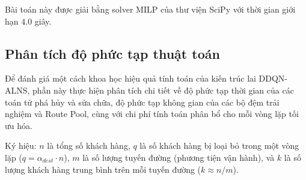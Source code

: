\documentclass[13pt,a4paper]{extarticle}
\begin{document}
Bài toán này được giải bằng solver MILP của thư viện SciPy với thời gian giới hạn $4.0$ giây.

\subsection{Phân tích độ phức tạp thuật toán}

Để đánh giá một cách khoa học hiệu quả tính toán của kiến trúc lai DDQN-ALNS, phần này thực hiện phân tích chi tiết về độ phức tạp thời gian của các toán tử phá hủy và sửa chữa, độ phức tạp không gian của các bộ đệm trải nghiệm và Route Pool, cùng với chi phí tính toán phân bổ cho mỗi vòng lặp tối ưu hóa.

Ký hiệu: $n$ là tổng số khách hàng, $q$ là số khách hàng bị loại bỏ trong một vòng lặp ($q = \alpha_{dest} \cdot n$), $m$ là số lượng tuyến đường (phương tiện vận hành), và $k$ là số lượng khách hàng trung bình trên mỗi tuyến đường ($k \approx n/m$).
\end{document}
